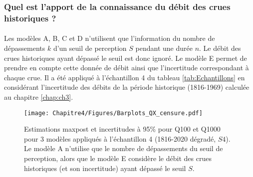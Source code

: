 \FloatBarrier

	\subsubsection{Quel est l'apport de la connaissance du débit des crues historiques ?}

	\paragraph{} Les modèles A, B, C et D n'utilisent que l'information du nombre de dépassements $k$ d'un seuil de perception $S$ pendant une durée $n$. Le débit des crues historiques ayant dépassé le seuil est donc ignoré. Le modèle E permet de prendre en compte cette donnée de débit ainsi que l'incertitude correspondant à chaque crue. Il a été appliqué à l'échantillon 4 du tableau \ref{tab:Echantillons} en considérant l'incertitude des débits de la période historique (1816-1969) calculée au chapitre \ref{chap:ch3}.
	
	
	\begin{figure}[h]
		\centering
		\texttt{[image: Chapitre4/Figures/Barplots\_QX\_censure.pdf]}
		\caption{Estimations maxpost et incertitudes à 95\% pour Q100 et Q1000 pour 3 modèles appliqués à l'échantillon 4 (1816-2020 dégradé, $S4$). Le modèle A n'utilise que le nombre de dépassements du seuil de perception, alors que le modèle E considère le débit des crues historiques (et son incertitude) ayant dépassé le seuil $S$.}
		\label{fig:CensureArtif}
	\end{figure}
	
%		
%	
